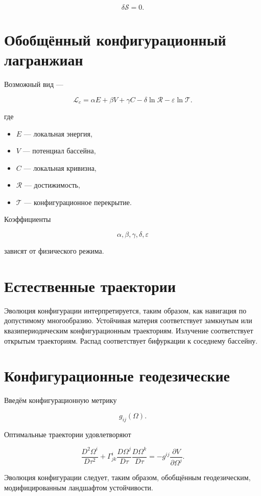 \[ \boxed{ \delta\mathcal S=0. } \]

\section{Обобщённый конфигурационный лагранжиан}

Возможный вид —

\[ \boxed{ \mathcal L_c = \alpha E + \beta V + \gamma C - \delta\ln\mathcal R - \varepsilon\ln\mathcal T. } \]

где

\begin{itemize}
\item $E$ — локальная энергия,
\item $V$ — потенциал бассейна,
\item $C$ — локальная кривизна,
\item $\mathcal R$ — достижимость,
\item $\mathcal T$ — конфигурационное перекрытие.
\end{itemize}

Коэффициенты

\[ \alpha,\beta,\gamma,\delta,\varepsilon \]

зависят от физического режима.

\section{Естественные траектории}

Эволюция конфигурации интерпретируется, таким образом, как навигация по допустимому многообразию. Устойчивая материя соответствует замкнутым или квазипериодическим конфигурационным траекториям. Излучение соответствует открытым траекториям. Распад соответствует бифуркации к соседнему бассейну.

\section{Конфигурационные геодезические}

Введём конфигурационную метрику

\[ g_{ij}(\Omega). \]

Оптимальные траектории удовлетворяют

\[ \boxed{ \frac{D^2\Omega^i}{D\tau^2} + \Gamma^i_{jk} \frac{D\Omega^j}{D\tau} \frac{D\Omega^k}{D\tau} = - g^{ij} \frac{\partial V}{\partial\Omega^j}. } \]

Эволюция конфигурации следует, таким образом, обобщённым геодезическим, модифицированным ландшафтом устойчивости.

